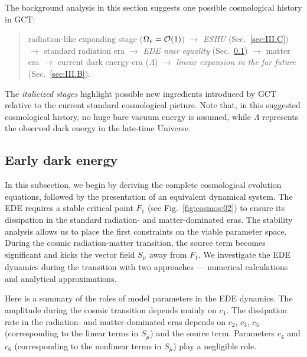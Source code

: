 \documentclass[aps,prd,twocolumn]{revtex4-2}
\newcommand\subF{\textsc{f}}
\begin{document}
The background analysis in this section suggests one possible cosmological history in GCT:
\begin{quote}
  radiation-like expanding stage ($\Omega_\subF=\mathcal{O}(1)$) 
  $\rightarrow$ \textit{ESHU} (Sec.~\ref{sec:III.C}) 
  $\rightarrow$ standard radiation era 
  $\rightarrow$ \textit{EDE near equality} (Sec.~\ref{sec:III.A}) 
  $\rightarrow$ matter era 
  $\rightarrow$ current dark energy era ($\Lambda$) 
  $\rightarrow$ \textit{linear expansion in the far future} (Sec.~\ref{sec:III.B}).
\end{quote}
The \textit{italicized stages} highlight possible new ingredients introduced by GCT relative to the current standard cosmological picture. Note that, in this suggested cosmological history, no huge bare vacuum energy is assumed, while $\Lambda$ represents the observed dark energy in the late-time Universe.

\subsection{Early dark energy}\label{sec:III.A}
In this subsection, we begin by deriving the complete cosmological evolution equations, followed by the presentation of an equivalent dynamical system. The EDE requires a stable critical point $F_1$ (see Fig.~\ref{fig:cosmos:02}) to ensure its dissipation in the standard radiation- and matter-dominated eras. The stability analysis allows us to place the first constraints on the viable parameter space. During the cosmic radiation-matter transition, the source term becomes significant and kicks the vector field $S_\mu$ away from $F_1$. We investigate the EDE dynamics during the transition with two approaches --- numerical calculations and analytical approximations. 

Here is a summary of the roles of model parameters in the EDE dynamics. The amplitude during the cosmic transition depends mainly on $c_1$. The dissipation rate in the radiation- and matter-dominated eras depends on $c_2$, $c_3$, $c_5$ (corresponding to the linear terms in $S_\mu$) and the source term. Parameters $c_4$ and $c_6$ (corresponding to the nonlinear terms in $S_\mu$) play a negligible role.
\end{document}
